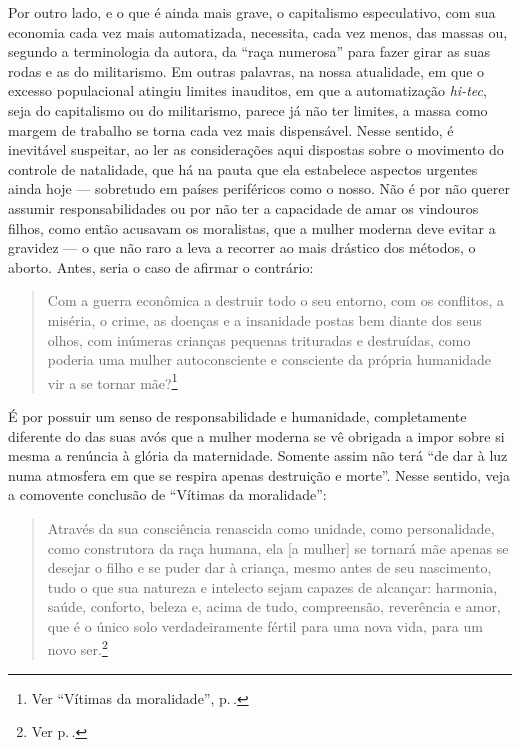 Por outro lado, e o que é
ainda mais grave, o capitalismo especulativo, com sua economia cada vez
mais automatizada, necessita, cada vez menos, das massas ou, segundo a
terminologia da autora, da ``raça numerosa'' para fazer girar as suas
rodas e as do militarismo. Em outras palavras, na nossa atualidade, em
que o excesso populacional atingiu limites inauditos, em que a
automatização \emph{hi-tec}, seja do capitalismo ou do militarismo, parece
já não ter limites, a massa como margem de trabalho se torna cada vez
mais dispensável. Nesse sentido, é inevitável suspeitar, ao ler as
considerações aqui dispostas sobre o movimento do controle de
natalidade, que há na pauta que ela estabelece aspectos urgentes ainda
hoje --- sobretudo em países periféricos como o nosso. Não é por não
querer assumir responsabilidades ou por não ter a capacidade de amar os
vindouros filhos, como então acusavam os moralistas, que a mulher
moderna deve evitar a gravidez --- o que não raro a leva a
recorrer ao mais drástico dos métodos, o aborto. Antes, seria o caso de
afirmar o contrário:

\begin{quote}
Com a guerra econômica a destruir todo o seu entorno, com os conflitos,
a miséria, o crime, as doenças e a insanidade postas bem diante dos seus
olhos, com inúmeras crianças pequenas trituradas e destruídas, como
poderia uma mulher autoconsciente e consciente da própria humanidade vir
a se tornar mãe?\footnote{Ver ``Vítimas da moralidade'', p.\,\pageref{entorno}.}
\end{quote}
 
É por possuir um senso de
responsabilidade e humanidade, completamente diferente do das suas avós
que a mulher moderna se vê obrigada a impor sobre si mesma a renúncia à
glória da maternidade. Somente assim não terá ``de dar à luz numa
atmosfera em que se respira apenas destruição e morte''. Nesse
sentido, veja a comovente conclusão de ``Vítimas da moralidade'':

\begin{quote}
Através da sua consciência renascida como unidade, como personalidade,
como construtora da raça humana, ela {[}a mulher{]} se tornará mãe apenas se desejar o
filho e se puder dar à criança, mesmo antes de seu nascimento, tudo o
que sua natureza e intelecto sejam capazes de alcançar: harmonia, saúde,
conforto, beleza e, acima de tudo, compreensão, reverência e amor, que é
o único solo verdadeiramente fértil para uma nova vida, para um novo
ser.\footnote{Ver p.\,\pageref{renascida}.}
\end{quote}


